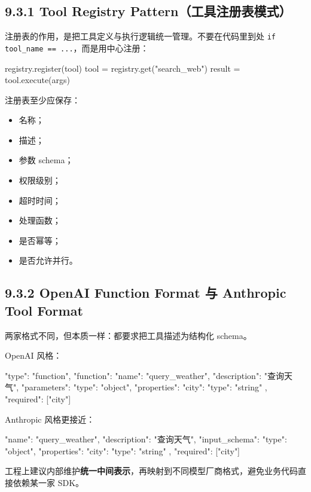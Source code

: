 \subsection{9.3.1 Tool Registry Pattern（工具注册表模式）}

注册表的作用，是把工具定义与执行逻辑统一管理。不要在代码里到处 \texttt{if tool\_name == ...}，而是用中心注册：


\begin{codeblock}
registry.register(tool)
tool = registry.get("search_web")
result = tool.execute(args)
\end{codeblock}

注册表至少应保存：


\begin{itemize}[leftmargin=2em]
\item 名称；
\item 描述；
\item 参数 schema；
\item 权限级别；
\item 超时时间；
\item 处理函数；
\item 是否幂等；
\item 是否允许并行。
\end{itemize}

\subsection{9.3.2 OpenAI Function Format 与 Anthropic Tool Format}

两家格式不同，但本质一样：都要求把工具描述为结构化 schema。


OpenAI 风格：


\begin{codeblock}
{
  "type": "function",
  "function": {
    "name": "query_weather",
    "description": "查询天气",
    "parameters": {
      "type": "object",
      "properties": {
        "city": {"type": "string"}
      },
      "required": ["city"]
    }
  }
}
\end{codeblock}

Anthropic 风格更接近：


\begin{codeblock}
{
  "name": "query_weather",
  "description": "查询天气",
  "input_schema": {
    "type": "object",
    "properties": {
      "city": {"type": "string"}
    },
    "required": ["city"]
  }
}
\end{codeblock}

工程上建议内部维护\textbf{统一中间表示}，再映射到不同模型厂商格式，避免业务代码直接依赖某一家 SDK。


